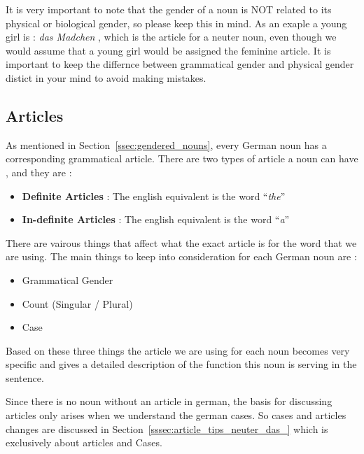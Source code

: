 \documentclass[a4paper,twocolumn,10pt]{article}
\newcommand{\newpar}
{\par \vspace{0.3cm}}
\begin{document}
It is very important to note that the gender of a noun is NOT related to its
physical or biological gender, so please keep this in mind. As an exaple a young
girl is : \textit{das Madchen} , which is the article for a neuter noun, even
though we would assume that a young girl would be assigned the feminine article.
It is important to keep the differnce between grammatical gender and physical
gender distict in your mind to avoid making mistakes.



\subsection{Articles}
\label{ssec:articles}

As mentioned in Section~\ref{ssec:gendered_nouns}, every German noun has a corresponding
grammatical article. There are two types of article a noun can have  , and they
are :

\nolinenumbers
\begin{itemize}[noitemsep]
	\item \textbf{Definite Articles} : The english equivalent is the word ``{\textit{the}}''
	\item \textbf{In-definite Articles} : The english equivalent is the word ``{\textit{a}}''
\end{itemize}
\linenumbers

There are vairous things that affect what the exact article is for the word that
we are using. The main things to keep into consideration for each German noun
are :

\nolinenumbers
\begin{itemize}[noitemsep]
	\item Grammatical Gender
	\item Count (Singular / Plural)
	\item Case
\end{itemize}
\linenumbers

Based on these three things the article we are using for each noun becomes very
specific and gives a detailed description of the function this noun is serving
in the sentence.\newpar

Since there is no noun without an article in german, the basis for discussing
articles only arises when we understand the german cases. So cases and articles
changes are discussed in Section~\ref{sssec:article_tips_neuter_das_} which is
exclusively about articles and Cases.\newpar
\end{document}
